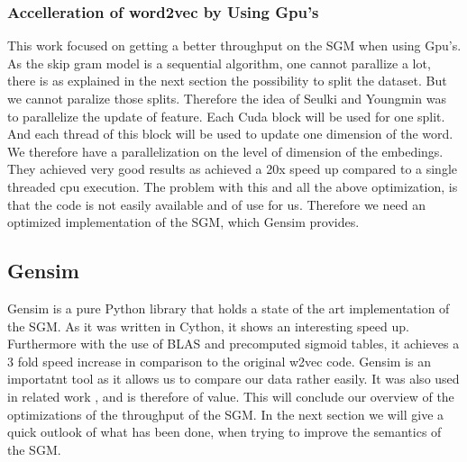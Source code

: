 {\subsubsection{Accelleration of word2vec by Using Gpu's}
This work \cite{gpu} focused on getting a better throughput on the SGM when using Gpu's. As the skip gram model is a sequential algorithm, one cannot parallize a lot, there is as explained in the next section the possibility to split the dataset. But we cannot paralize those splits. Therefore the idea of Seulki and Youngmin was to parallelize the update of feature. Each Cuda block will be used for one split. And each thread of this block will be used to update one dimension of the word. We therefore have a parallelization on the level of dimension of the embedings. They achieved very good results as achieved a 20x speed up compared to a single threaded cpu execution. The problem with this and all the above optimization, is that the code is not easily available and of use for us. Therefore we need an optimized implementation of the SGM, which Gensim \cite{gensim} provides. 
\subsection{Gensim}
Gensim \cite{gensim} is a pure Python library that holds a state of the art implementation of the SGM. As it was written in Cython, it shows an interesting speed up. Furthermore with the use of BLAS and precomputed sigmoid tables, it achieves a 3 fold speed increase in comparison to the original w2vec code. Gensim is an importatnt tool as it allows us to compare our data rather easily. It was also used in related work \cite{intel}, and is therefore of value. This will conclude our overview of the optimizations of the throughput of the SGM. In the next section we will give a quick outlook of what has been done, when trying to improve the semantics of the SGM.


}
